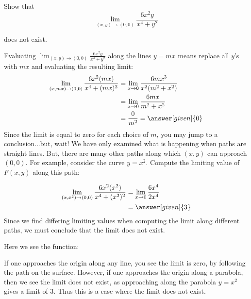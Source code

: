 \documentclass{ximera}
\begin{document}
\begin{example}
  Show that
  \[
  \lim_{(x,y)\to(0,0)}  \frac{6x^2y}{x^4+y^2}
  \]

  does not exist.
  \begin{explanation}
    Evaluating $\lim_{(x,y)\to(0,0)} \frac{6x^2y}{x^4+y^2}$ along
    the lines $y=mx$ means replace all $y$'s with $mx$ and evaluating
    the resulting limit:
    \begin{align*}
      \lim_{(x,mx)\to(0,0)}  \frac{6x^2(mx)}{x^4+(mx)^2} &=\lim_{x\to0} \frac{6mx^3}{x^2(m^2+x^2)}\\
      &= \lim_{x\to 0}\frac{6mx}{m^2+x^2}\\
      &= {\frac{0}{m^2}}=\answer[given]{0}
    \end{align*}
   Since the limit is equal to zero for each choice of $m$, you may jump to a conclusion...but, wait!
    We have only examined what is happening when paths are straight lines. But, there are many other paths along which $(x,y)$ can approach $(0,0)$.
    For example, consider the curve $y=x^2$. Compute the limiting value of $F(x,y)$ along this path:

    \begin{align*}
      \lim_{(x,x^2)\to(0,0)}  \frac{6x^2(x^2)}{x^4+(x^2)^2} &=\lim_{x\to0} \frac{6x^4}{2x^4}\\
      &=\answer[given]{ 3}
    \end{align*}
     Since we find differing limiting values when computing the limit
    along different paths, we must conclude that the limit does not
    exist.

\begin{onlineOnly}
  Here we see the function:

  \begin{center}
  \end{center}
  If one approaches the origin along any line, you see the limit
   is zero, by following the path on the
  surface. However, if one approaches the origin along a parabola,
  then we see the limit does not exist, as approaching along the
  parabola $y=x^2$ gives a limit of $3$.
 Thus this is a case where
  the limit does not exist.
\end{onlineOnly}
 \end{explanation}
\end{example}
\end{document}
